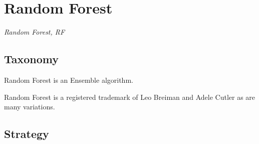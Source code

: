 

\section{Random Forest} 
\label{sec:randomforest}

\emph{Random Forest, RF}

\subsection{Taxonomy}
Random Forest is an Ensemble algorithm. 

Random Forest is a registered trademark of Leo Breiman and Adele Cutler as are many variations.

\subsection{Strategy}

